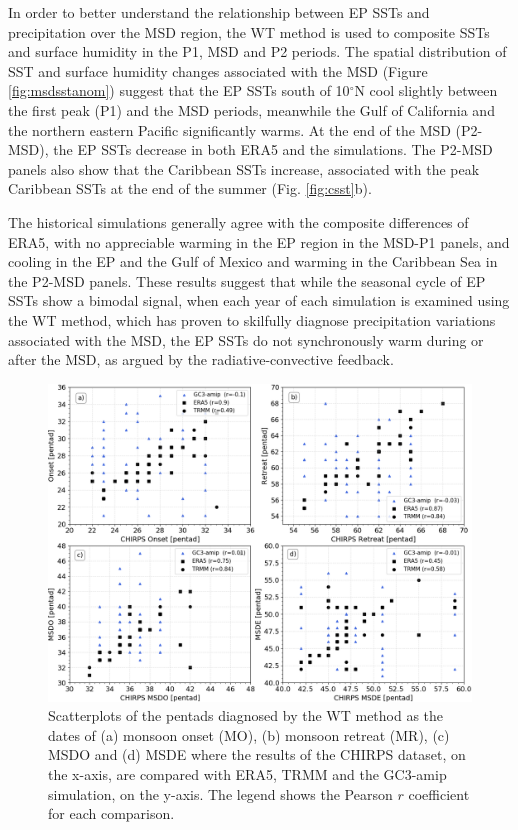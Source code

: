 In order to better understand the relationship between EP SSTs and precipitation over the MSD region, the WT method is used to composite SSTs and surface humidity in the P1, MSD and P2 periods. 
The spatial distribution of SST and surface humidity changes associated with the MSD  (Figure \ref{fig:msdsstanom}) suggest that the EP SSTs south of 10$^\circ$N cool slightly between the first peak (P1) and the MSD periods, meanwhile the Gulf of California and the northern eastern Pacific significantly warms. At the end of the MSD (P2-MSD), the EP SSTs decrease in both ERA5 and the simulations. 
The P2-MSD panels also show that the Caribbean SSTs increase, associated with the peak Caribbean SSTs  at the end of the summer (Fig. \ref{fig:csst}b).

The historical simulations generally agree with the composite differences of ERA5, with no appreciable warming in the EP region in the MSD-P1 panels, and cooling in the EP and the Gulf of Mexico and warming in the Caribbean Sea in the P2-MSD panels.
These results suggest that while the seasonal cycle of EP SSTs show a bimodal signal, when each year of each simulation is examined using the WT method, which has proven to skilfully diagnose precipitation variations associated with the MSD, the EP SSTs do not synchronously warm during or after the MSD, as argued by the radiative-convective feedback.


\begin{figure}[t!]
\includegraphics[width=\linewidth]{figures/master_sst_scatter.png}
\caption[Scatter plot of SST vs precipitation]{Scatterplots of the pentads diagnosed by the WT method as the dates of (a) monsoon onset (MO), (b) monsoon retreat (MR), (c) MSDO and (d) MSDE where the results of the CHIRPS dataset, on the x-axis, are compared with ERA5, TRMM and the GC3-amip simulation, on the y-axis. The legend shows the Pearson $r$ coefficient for each comparison. }
\label{fig:amipsstscatter}
\end{figure}


